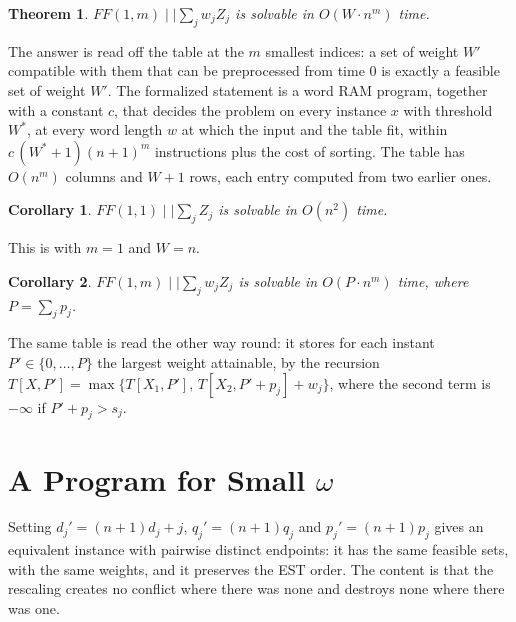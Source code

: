 \documentclass[11pt,a4paper]{article}
\newtheorem{theorem}{Theorem}
\newtheorem{corollary}{Corollary}
\theoremstyle{definition}
\theoremstyle{plain}
\newcommand{\FF}{FF(1,m)\mid\mid\textstyle\sum_j w_jZ_j}
\begin{document}
\setcounter{theorem}{1}
\begin{theorem}\label{thm:mainDP}
$\FF$ is solvable in $O(W\cdot n^m)$ time.
\end{theorem}
The answer is read off the table at the $m$ smallest indices: a set of weight $W'$ compatible
with them that can be preprocessed from time $0$ is exactly a feasible set of weight $W'$.
The formalized statement is a word RAM program, together with a constant $c$, that decides the
problem on every instance $x$ with threshold $W^*$, at every word length $w$ at which the input
and the table fit, within $c\,(W^*+1)(n+1)^m$ instructions plus the cost of sorting. The table
has $O(n^m)$ columns and $W+1$ rows, each entry computed from two earlier ones.

\begin{corollary}\label{cor:unweighted}
$FF(1,1)\mid\mid\sum_jZ_j$ is solvable in $O(n^2)$ time.
\end{corollary}
This is  with $m=1$ and $W=n$.

\begin{corollary}\label{cor:P}
$\FF$ is solvable in $O(P\cdot n^m)$ time, where $P=\sum_jp_j$.
\end{corollary}
The same table is read the other way round: it stores for each instant $P'\in\{0,\ldots,P\}$ the
largest weight attainable, by the recursion $T[X,P']=\max\{T[X_1,P'],\,T[X_2,P'+p_j]+w_j\}$,
where the second term is $-\infty$ if $P'+p_j>s_j$.

\section{A Program for Small $\omega$}\label{sec:sweep}

Setting $d_j'=(n+1)d_j+j$, $q_j'=(n+1)q_j$ and $p_j'=(n+1)p_j$ gives an equivalent instance with
pairwise distinct endpoints: it has the same feasible sets, with the same weights, and it
preserves the EST order.
The content is that the rescaling creates no conflict where there was none and destroys none
where there was one.
\end{document}
